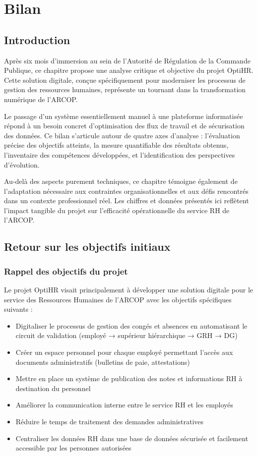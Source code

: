 \chapter{Bilan}
\clearpage

\section{Introduction}
Après six mois d'immersion au sein de l'Autorité de Régulation de la Commande Publique, ce chapitre propose une analyse critique et objective du projet OptiHR. Cette solution digitale, conçue spécifiquement pour moderniser les processus de gestion des ressources humaines, représente un tournant dans la transformation numérique de l'ARCOP. 

Le passage d'un système essentiellement manuel à une plateforme informatisée répond à un besoin concret d'optimisation des flux de travail et de sécurisation des données. Ce bilan s'articule autour de quatre axes d'analyse : l'évaluation précise des objectifs atteints, la mesure quantifiable des résultats obtenus, l'inventaire des compétences développées, et l'identification des perspectives d'évolution.

Au-delà des aspects purement techniques, ce chapitre témoigne également de l'adaptation nécessaire aux contraintes organisationnelles et aux défis rencontrés dans un contexte professionnel réel. Les chiffres et données présentés ici reflètent l'impact tangible du projet sur l'efficacité opérationnelle du service RH de l'ARCOP.

\section{Retour sur les objectifs initiaux}

\subsection{Rappel des objectifs du projet}
Le projet OptiHR visait principalement à développer une solution digitale pour le service des Ressources Humaines de l'ARCOP avec les objectifs spécifiques suivants :

\begin{itemize}
    \item Digitaliser le processus de gestion des congés et absences en automatisant le circuit de validation (employé → supérieur hiérarchique → GRH → DG)
    \item Créer un espace personnel pour chaque employé permettant l'accès aux documents administratifs (bulletins de paie, attestations)
    \item Mettre en place un système de publication des notes et informations RH à destination du personnel
    \item Améliorer la communication interne entre le service RH et les employés
    \item Réduire le temps de traitement des demandes administratives 
    \item Centraliser les données RH dans une base de données sécurisée et facilement accessible par les personnes autorisées
\end{itemize}

